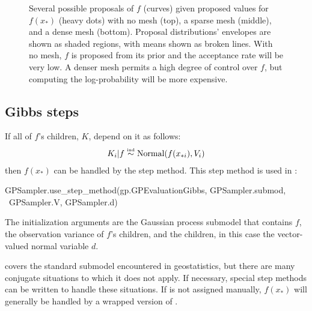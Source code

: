 \begin{figure}
    \centering
    \caption{Several possible proposals of $f$ (curves) given proposed values for $f(x_*)$ (heavy dots) with no mesh (top), a sparse mesh (middle), and a dense mesh (bottom). Proposal distributions' envelopes are shown as shaded regions, with means shown as broken lines. With no mesh, $f$ is proposed from its prior and the acceptance rate will be very low. A denser mesh permits a high degree of control over $f$, but computing the log-probability will be more expensive.}
    \label{fig:meshpropose}
\end{figure}

\subsection{Gibbs steps} 
If all of $f$'s children, $K$, depend on it as follows:
\begin{eqnarray*}
    K_i|f \stackrel{\textup{\tiny ind}}{\sim} \textup{Normal}(f(x_{*i}),V_i)
\end{eqnarray*}
then $f(x_*)$ can be handled by the  step method. This step method is used in :
\begin{CodeChunk}
\begin{CodeInput}
GPSampler.use_step_method(gp.GPEvaluationGibbs, GPSampler.submod, \
    GPSampler.V, GPSampler.d)
\end{CodeInput}
\end{CodeChunk}
The initialization arguments are the Gaussian process submodel that contains $f$, the observation variance of $f$'s children, and the children, in this case the vector-valued normal variable $d$. 

 covers the standard submodel encountered in geostatistics, but there are many conjugate situations to which it does not apply. If necessary, special step methods can be written to handle these situations. If  is not assigned manually, $f(x_*)$ will generally be handled by a wrapped version of  \citep{pymc}.





